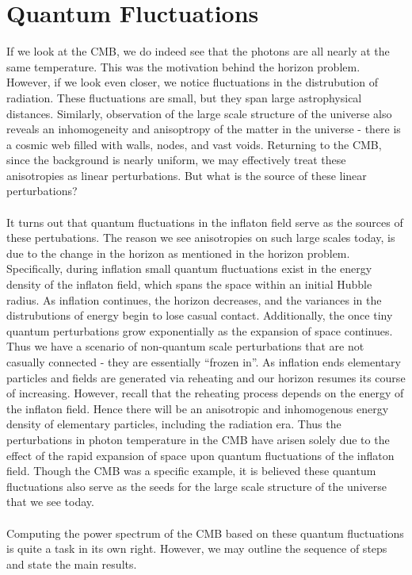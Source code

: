 \documentclass[10pt,letterpaper]{article}
\begin{document}
\section{Quantum Fluctuations}
If we look at the CMB, we do indeed see that the photons are all nearly at the same temperature. This was the motivation behind the horizon problem. However, if we look even closer, we notice fluctuations in the distrubution of radiation. These fluctuations are small, but they span large astrophysical distances. Similarly, observation of the large scale structure of the universe also reveals an inhomogeneity and anisoptropy of the matter in the universe - there is a cosmic web filled with walls, nodes, and vast voids. Returning to the CMB, since the background is nearly uniform, we may effectively treat these anisotropies as linear perturbations. But what is the source of these linear perturbations?\\ \\
It turns out that quantum fluctuations in the inflaton field serve as the sources of these pertubations. The reason we see anisotropies on such large scales today, is due to the change in the horizon as mentioned in the horizon problem. Specifically, during inflation small quantum fluctuations exist in the energy density of the inflaton field, which spans the space within an initial Hubble radius. As inflation continues, the horizon decreases, and the variances in the distrubutions of energy begin to lose casual contact. Additionally, the once tiny quantum perturbations grow exponentially as the expansion of space continues. Thus we have a scenario of non-quantum scale perturbations that are not casually connected - they are essentially ``frozen in''. As inflation ends elementary particles and fields are generated via reheating and our horizon resumes its course of increasing. However, recall that the reheating process depends on the energy of the inflaton field. Hence there will be an anisotropic and inhomogenous energy density of elementary particles, including the radiation era. Thus the perturbations in photon temperature in the CMB have arisen solely due to the effect of the rapid expansion of space upon quantum fluctuations of the inflaton field. Though the CMB was a specific example, it is believed these quantum fluctuations also serve as the seeds for the large scale structure of the universe that we see today. 
\\ \\
Computing the power spectrum of the CMB based on these quantum fluctuations is quite a task in its own right. However, we may outline the sequence of steps and state the main results.\\ \\
\end{document}
